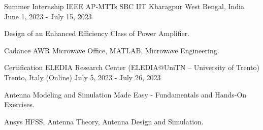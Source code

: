 

\begin{cventries}

  \cventry
    {Summer Internship} %
    {IEEE AP-MTTs SBC IIT Kharagpur} %
    {West Bengal, India} %
    {June 1, 2023 - July 15, 2023} %
    {
      \begin{cvitems} %
        \item {Design of an Enhanced Efficiency Class of Power Amplifier.}
        \item { Cadance AWR Microwave Office, MATLAB, Microwave Engineering.}
      \end{cvitems}
    }


\cventry
{Certification} %
{ELEDIA Research Center (ELEDIA@UniTN – University of Trento)} %
{Trento, Italy (Online)} %
{July 5, 2023 - July 26, 2023} %
{
	\begin{cvitems} %
		\item {Antenna Modeling and Simulation Made Easy - Fundamentals and Hands-On Exercises.}
		\item { Ansys HFSS, Antenna Theory, Antenna Design and Simulation.}
	\end{cvitems}
}

\end{cventries}
